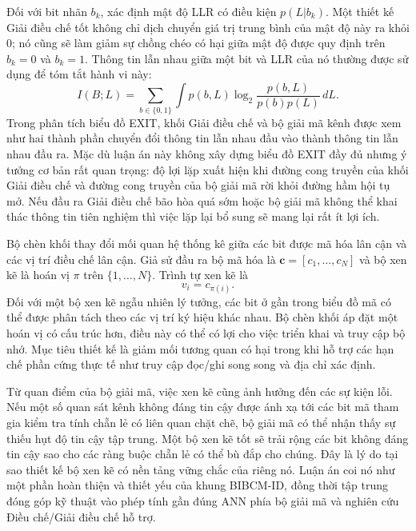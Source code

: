 Đối với bit nhãn $b_k$, xác định mật độ LLR có điều kiện $p(L|b_k)$. Một thiết kế Giải điều chế tốt không chỉ dịch chuyển giá trị trung bình của mật độ này ra khỏi 0; nó cũng sẽ làm giảm sự chồng chéo có hại giữa mật độ được quy định trên $b_k=0$ và $b_k=1$. Thông tin lẫn nhau giữa một bit và LLR của nó thường được sử dụng để tóm tắt hành vi này:
\begin{equation}
  I(B;L)=
  \sum_{b\in\{0,1\}}\int p(b,L)
  \log_2\frac{p(b,L)}{p(b)p(L)}\,dL.
\end{equation}
Trong phân tích biểu đồ EXIT, khối Giải điều chế và bộ giải mã kênh được xem như hai thành phần chuyển đổi thông tin lẫn nhau đầu vào thành thông tin lẫn nhau đầu ra. Mặc dù luận án này không xây dựng biểu đồ EXIT đầy đủ nhưng ý tưởng cơ bản rất quan trọng: độ lợi lặp xuất hiện khi đường cong truyền của khối Giải điều chế và đường cong truyền của bộ giải mã rời khỏi đường hầm hội tụ mở. Nếu đầu ra Giải điều chế bão hòa quá sớm hoặc bộ giải mã không thể khai thác thông tin tiên nghiệm thì việc lặp lại bổ sung sẽ mang lại rất ít lợi ích.

Bộ chèn khối thay đổi mối quan hệ thống kê giữa các bit được mã hóa lân cận và các vị trí điều chế lân cận. Giả sử đầu ra bộ mã hóa là $\mathbf{c}=[c_1,\ldots,c_N]$ và bộ xen kẽ là hoán vị $\pi$ trên $\{1,\ldots,N\}$. Trình tự xen kẽ là
\begin{equation}
  v_i=c_{\pi(i)}.
\end{equation}
Đối với một bộ xen kẽ ngẫu nhiên lý tưởng, các bit ở gần trong biểu đồ mã có thể được phân tách theo các vị trí ký hiệu khác nhau. Bộ chèn khối áp đặt một hoán vị có cấu trúc hơn, điều này có thể có lợi cho việc triển khai và truy cập bộ nhớ. Mục tiêu thiết kế là giảm mối tương quan có hại trong khi hỗ trợ các hạn chế phần cứng thực tế như truy cập đọc/ghi song song và địa chỉ xác định.

Từ quan điểm của bộ giải mã, việc xen kẽ cũng ảnh hưởng đến các sự kiện lỗi. Nếu một số quan sát kênh không đáng tin cậy được ánh xạ tới các bit mã tham gia kiểm tra tính chẵn lẻ có liên quan chặt chẽ, bộ giải mã có thể nhận thấy sự thiếu hụt độ tin cậy tập trung. Một bộ xen kẽ tốt sẽ trải rộng các bit không đáng tin cậy sao cho các ràng buộc chẵn lẻ có thể bù đắp cho chúng. Đây là lý do tại sao thiết kế bộ xen kẽ có nền tảng vững chắc của riêng nó. Luận án coi nó như một phần hoàn thiện và thiết yếu của khung BIBCM-ID, đồng thời tập trung đóng góp kỹ thuật vào phép tính gần đúng ANN phía bộ giải mã và nghiên cứu Điều chế/Giải điều chế hỗ trợ.

